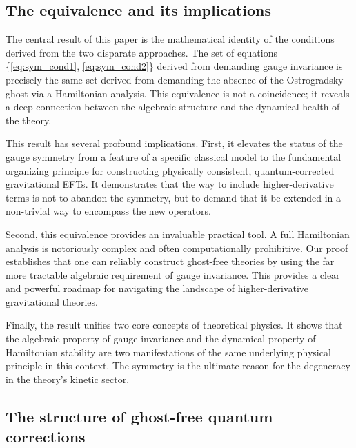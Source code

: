 \documentclass[twocolumn]{aastex631}
\begin{document}
\subsection{The equivalence and its implications}

The central result of this paper is the mathematical identity of the conditions derived from the two disparate approaches. The set of equations \{\eqref{eq:sym_cond1}, \eqref{eq:sym_cond2}\} derived from demanding gauge invariance is precisely the same set derived from demanding the absence of the Ostrogradsky ghost via a Hamiltonian analysis. This equivalence is not a coincidence; it reveals a deep connection between the algebraic structure and the dynamical health of the theory.

This result has several profound implications. First, it elevates the status of the gauge symmetry from a feature of a specific classical model to the fundamental organizing principle for constructing physically consistent, quantum-corrected gravitational EFTs. It demonstrates that the way to include higher-derivative terms is not to abandon the symmetry, but to demand that it be extended in a non-trivial way to encompass the new operators.

Second, this equivalence provides an invaluable practical tool. A full Hamiltonian analysis is notoriously complex and often computationally prohibitive. Our proof establishes that one can reliably construct ghost-free theories by using the far more tractable algebraic requirement of gauge invariance. This provides a clear and powerful roadmap for navigating the landscape of higher-derivative gravitational theories.

Finally, the result unifies two core concepts of theoretical physics. It shows that the algebraic property of gauge invariance and the dynamical property of Hamiltonian stability are two manifestations of the same underlying physical principle in this context. The symmetry is the ultimate reason for the degeneracy in the theory's kinetic sector.

\subsection{The structure of ghost-free quantum corrections}
\end{document}
